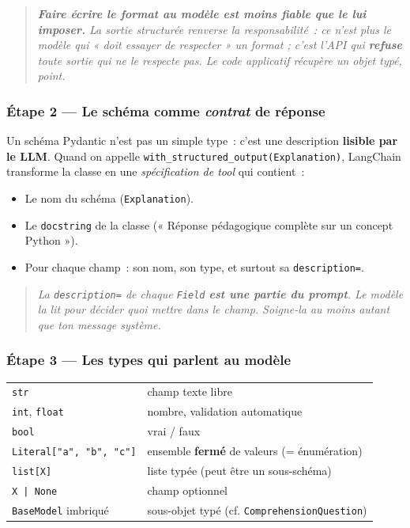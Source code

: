 \documentclass[11pt,a4paper]{article}
\begin{document}
\begin{quote}\itshape
\textbf{Faire écrire le format au modèle est moins fiable que le lui
imposer.} La sortie structurée renverse la responsabilité~: ce n'est plus
le modèle qui « doit essayer de respecter » un format ; c'est l'API qui
\textbf{refuse} toute sortie qui ne le respecte pas. Le code applicatif
récupère un objet typé, point.
\end{quote}

\subsubsection*{Étape 2 — Le schéma comme \emph{contrat} de réponse}

Un schéma Pydantic n'est pas un simple type~: c'est une description
\textbf{lisible par le LLM}. Quand on appelle
\texttt{with\_structured\_output(Explanation)}, LangChain transforme la
classe en une \emph{spécification de tool} qui contient~:

\begin{itemize}[leftmargin=*]
  \item Le nom du schéma (\texttt{Explanation}).
  \item Le \texttt{docstring} de la classe (« Réponse pédagogique complète
        sur un concept Python »).
  \item Pour chaque champ~: son nom, son type, et surtout sa
        \texttt{description=}.
\end{itemize}

\begin{quote}\itshape
La \texttt{description=} de chaque \texttt{Field} \textbf{est une partie du
prompt}. Le modèle la lit pour décider quoi mettre dans le champ. Soigne-la
au moins autant que ton message système.
\end{quote}

\subsubsection*{Étape 3 — Les types qui parlent au modèle}

\begin{center}
\begin{tabular}{ll}
\texttt{str}                     & champ texte libre \\
\texttt{int}, \texttt{float}     & nombre, validation automatique \\
\texttt{bool}                    & vrai / faux \\
\texttt{Literal["a", "b", "c"]}  & ensemble \textbf{fermé} de valeurs (= énumération) \\
\texttt{list[X]}                 & liste typée (peut être un sous-schéma) \\
\texttt{X | None}                & champ optionnel \\
\texttt{BaseModel} imbriqué      & sous-objet typé (cf. \texttt{ComprehensionQuestion}) \\
\end{tabular}
\end{center}
\end{document}
